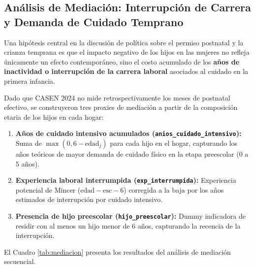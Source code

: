 \documentclass[11pt,a4paper]{article}
\begin{document}
\subsection{Análisis de Mediación: Interrupción de Carrera y Demanda de Cuidado Temprano}
Una hipótesis central en la discusión de política sobre el permiso postnatal y la crianza temprana es que el impacto negativo de los hijos en las mujeres no refleja únicamente un efecto contemporáneo, sino el costo acumulado de los \textbf{años de inactividad o interrupción de la carrera laboral} asociados al cuidado en la primera infancia.

Dado que CASEN 2024 no mide retrospectivamente los meses de postnatal efectivo, se construyeron tres proxies de mediación a partir de la composición etaria de los hijos en cada hogar:
\begin{enumerate}
    \item \textbf{Años de cuidado intensivo acumulados (\texttt{anios\_cuidado\_intensivo}):} Suma de $\max(0, 6 - \text{edad}_j)$ para cada hijo en el hogar, capturando los años teóricos de mayor demanda de cuidado físico en la etapa preescolar (0 a 5 años).
    \item \textbf{Experiencia laboral interrumpida (\texttt{exp\_interrumpida}):} Experiencia potencial de Mincer ($\text{edad} - \text{esc} - 6$) corregida a la baja por los años estimados de interrupción por cuidado intensivo.
    \item \textbf{Presencia de hijo preescolar (\texttt{hijo\_preescolar}):} Dummy indicadora de residir con al menos un hijo menor de 6 años, capturando la recencia de la interrupción.
\end{enumerate}

El Cuadro \ref{tab:mediacion} presenta los resultados del análisis de mediación secuencial.
\end{document}
